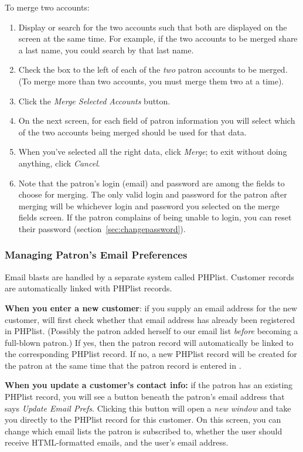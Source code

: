 To merge two accounts:
\begin{enumerate}
\item Display or search for the two accounts such that both are
  displayed on the screen at the same time.  For example, if the two
  accounts to be merged share a last name, you could search by that last
  name.
\item Check the box to the left of each of the \emph{two} patron
  accounts to be merged.  (To merge more than two accounts, you must
  merge them two at a time).
\item Click the \emph{Merge Selected Accounts} button.
\item On the next screen, for each field of patron information you will
  select which of the two accounts being merged should be used for that
  data.
\item When you've selected all the right data, click \emph{Merge}; to
  exit without doing anything, click \emph{Cancel}.
\item Note that the patron's login (email) and password are among the
  fields to choose for merging.  The only valid login and password for
  the patron after merging will be whichever login and password you
  selected on the merge fields screen.  If the patron complains of being
  unable to login, you can reset their password
  (section~\ref{sec:changepassword}). 
\end{enumerate}


\subsubsection{Managing Patron's Email Preferences}
\label{sec:phplist}

Email blasts are handled by a separate system called PHPlist.
Customer records are automatically linked with PHPlist records.

\textbf{When you enter a new customer}: if you supply an email address
for the new customer, \af will first check whether that email address
has already been registered in PHPlist.  (Possibly the patron added
herself to our email list \emph{before} becoming a full-blown patron.)
If yes, then the \af patron record will automatically be linked to the
corresponding PHPlist record.  If no, a new PHPlist record will be
created for the patron at the same time that the patron record is
entered in \af.

\textbf{When you update a customer's contact info:} if the patron has an
existing PHPlist record, you will see a button beneath the patron's
email address that says \emph{Update Email Prefs}.  Clicking this button
will open a \emph{new window} and take you directly to the PHPlist
record for this customer.  On this screen, you can change which email
lists the patron is subscribed to, whether the user should receive
HTML-formatted emails, and the user's email address.

